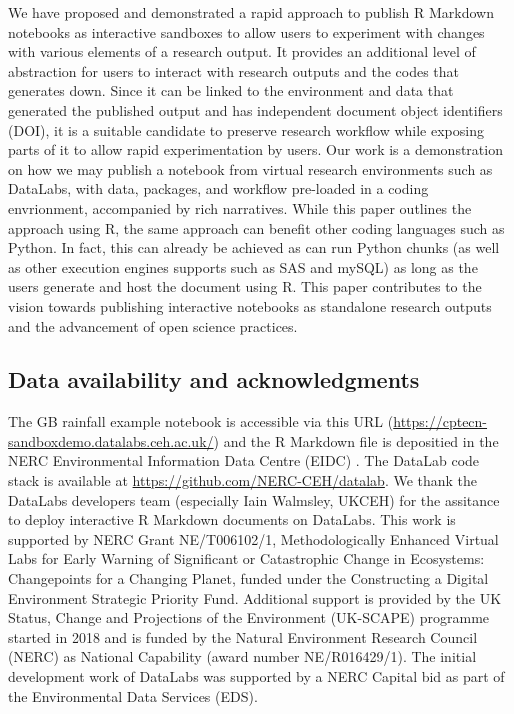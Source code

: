 We have proposed and demonstrated a rapid approach to publish R Markdown
notebooks as interactive sandboxes to allow users to experiment with
changes with various elements of a research output. It provides an
additional level of abstraction for users to interact with research
outputs and the codes that generates down. Since it can be linked to the
environment and data that generated the published output and has
independent document object identifiers (DOI), it is a suitable
candidate to preserve research workflow while exposing parts of it to
allow rapid experimentation by users. Our work is a demonstration on how
we may publish a notebook from virtual research environments such as
DataLabs, with data, packages, and workflow pre-loaded in a coding
envrionment, accompanied by rich narratives. While this paper outlines
the approach using R, the same approach can benefit other coding
languages such as Python. In fact, this can already be achieved as
 can run Python chunks (as well as other execution
engines  supports such as SAS and mySQL) as long as the
users generate and host the document using R. This paper contributes to
the vision towards publishing interactive notebooks as standalone
research outputs and the advancement of open science practices.

\hypertarget{data-availability-and-acknowledgments}{%
\subsection{Data availability and
acknowledgments}\label{data-availability-and-acknowledgments}}

The GB rainfall example notebook is accessible via this URL
(\url{https://cptecn-sandboxdemo.datalabs.ceh.ac.uk/}) and the R
Markdown file is depositied in the NERC Environmental Information Data
Centre (EIDC) \citep{EIDC}. The DataLab code stack is available at
\url{https://github.com/NERC-CEH/datalab}. We thank the DataLabs
developers team (especially Iain Walmsley, UKCEH) for the assitance to
deploy interactive R Markdown documents on DataLabs. This work is
supported by NERC Grant NE/T006102/1, Methodologically Enhanced Virtual
Labs for Early Warning of Significant or Catastrophic Change in
Ecosystems: Changepoints for a Changing Planet, funded under the
Constructing a Digital Environment Strategic Priority Fund. Additional
support is provided by the UK Status, Change and Projections of the
Environment (UK-SCAPE) programme started in 2018 and is funded by the
Natural Environment Research Council (NERC) as National Capability
(award number NE/R016429/1). The initial development work of DataLabs
was supported by a NERC Capital bid as part of the Environmental Data
Services (EDS).

